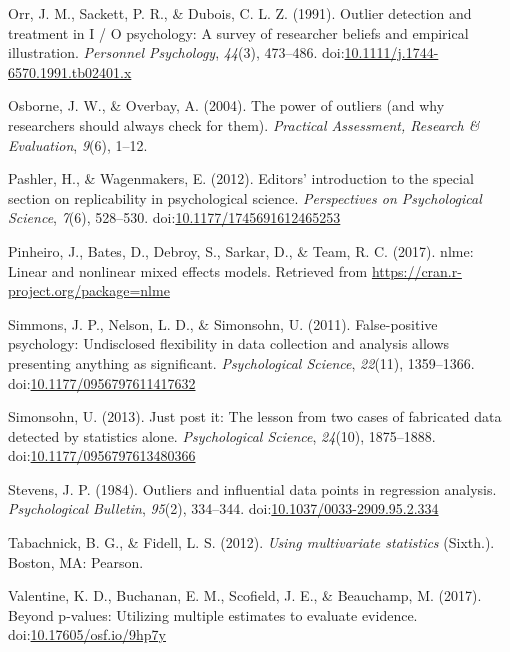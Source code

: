 \documentclass[english,man]{apa6}
\theoremstyle{definition}
\theoremstyle{definition}
\theoremstyle{definition}
\theoremstyle{remark}
\begin{document}
\hypertarget{ref-Orr1991}{}
Orr, J. M., Sackett, P. R., \& Dubois, C. L. Z. (1991). Outlier
detection and treatment in I / O psychology: A survey of researcher
beliefs and empirical illustration. \emph{Personnel Psychology},
\emph{44}(3), 473--486.
doi:\href{https://doi.org/10.1111/j.1744-6570.1991.tb02401.x}{10.1111/j.1744-6570.1991.tb02401.x}

\hypertarget{ref-Osborne2004}{}
Osborne, J. W., \& Overbay, A. (2004). The power of outliers (and why
researchers should always check for them). \emph{Practical Assessment,
Research \& Evaluation}, \emph{9}(6), 1--12.

\hypertarget{ref-Pashler2012a}{}
Pashler, H., \& Wagenmakers, E. (2012). Editors' introduction to the
special section on replicability in psychological science.
\emph{Perspectives on Psychological Science}, \emph{7}(6), 528--530.
doi:\href{https://doi.org/10.1177/1745691612465253}{10.1177/1745691612465253}

\hypertarget{ref-Pinheiro2017}{}
Pinheiro, J., Bates, D., Debroy, S., Sarkar, D., \& Team, R. C. (2017).
nlme: Linear and nonlinear mixed effects models. Retrieved from
\url{https://cran.r-project.org/package=nlme}

\hypertarget{ref-Simmons2011}{}
Simmons, J. P., Nelson, L. D., \& Simonsohn, U. (2011). False-positive
psychology: Undisclosed flexibility in data collection and analysis
allows presenting anything as significant. \emph{Psychological Science},
\emph{22}(11), 1359--1366.
doi:\href{https://doi.org/10.1177/0956797611417632}{10.1177/0956797611417632}

\hypertarget{ref-Simonsohn2013}{}
Simonsohn, U. (2013). Just post it: The lesson from two cases of
fabricated data detected by statistics alone. \emph{Psychological
Science}, \emph{24}(10), 1875--1888.
doi:\href{https://doi.org/10.1177/0956797613480366}{10.1177/0956797613480366}

\hypertarget{ref-Stevens1984}{}
Stevens, J. P. (1984). Outliers and influential data points in
regression analysis. \emph{Psychological Bulletin}, \emph{95}(2),
334--344.
doi:\href{https://doi.org/10.1037/0033-2909.95.2.334}{10.1037/0033-2909.95.2.334}

\hypertarget{ref-Tabachnick2012}{}
Tabachnick, B. G., \& Fidell, L. S. (2012). \emph{Using multivariate
statistics} (Sixth.). Boston, MA: Pearson.

\hypertarget{ref-Valentine2017}{}
Valentine, K. D., Buchanan, E. M., Scofield, J. E., \& Beauchamp, M.
(2017). Beyond p-values: Utilizing multiple estimates to evaluate
evidence.
doi:\href{https://doi.org/10.17605/osf.io/9hp7y}{10.17605/osf.io/9hp7y}
\end{document}
